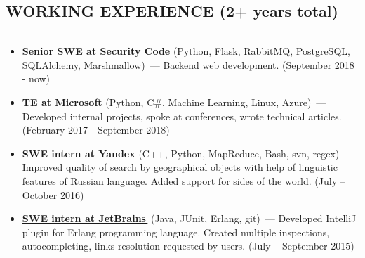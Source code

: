 \documentclass[11pt]{res} %
\let\orighref\href
\renewcommand{\href}[2]{\orighref{#1}{#2\,\faExternalLink}}
\begin{document}
\begin{resume}
\section{\uppercase{Working Experience} (2+ years total)}
\begin{spacing}{0.3}
\textcolor[RGB]{220,220,220}{\rule{\linewidth}{0.4pt}} 
\end{spacing}
\vspace{0.2in}
   \begin{itemize} \itemsep -2pt  %
   \item {\textbf{Senior SWE at Security Code}} (Python, Flask, RabbitMQ, PostgreSQL, SQLAlchemy, Marshmallow)~--- Backend web development. (September 2018 - now)
   \item {\textbf{TE at Microsoft}} (Python, C\#, Machine Learning, Linux, Azure)~--- Developed internal projects, spoke at conferences, wrote technical articles. (February 2017 - September 2018)
   \item {\textbf{SWE intern at Yandex}} (C++, Python, MapReduce, Bash, svn, regex)~--- Improved quality of search by geographical objects with help of linguistic features of Russian language. Added support for sides of the world. (July – October 2016)
   \item \textbf{\href{https://github.com/ignatov/intellij-erlang/commits?author=telezhnaya}{SWE intern at JetBrains}} (Java, JUnit, Erlang, git)~--- Developed IntelliJ plugin for Erlang programming language. Created multiple inspections, autocompleting, links resolution requested by users. (July – September 2015)
 \end{itemize}


\end{resume}
\end{document}
